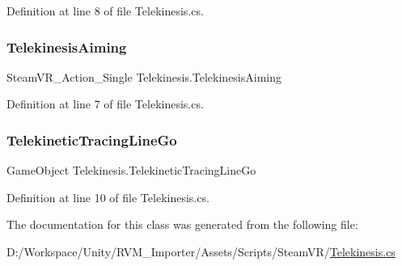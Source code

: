 Definition at line 8 of file Telekinesis.\+cs.

\mbox{\label{class_telekinesis_a7a53fb30be87da42a5c0f1c353961436}} 
\subsubsection{\texorpdfstring{TelekinesisAiming}{TelekinesisAiming}}
{\footnotesize\ttfamily Steam\+V\+R\+\_\+\+Action\+\_\+\+Single Telekinesis.\+Telekinesis\+Aiming}



Definition at line 7 of file Telekinesis.\+cs.

\mbox{\label{class_telekinesis_a4a511b637671edf2a8223b53f406fca6}} 
\subsubsection{\texorpdfstring{TelekineticTracingLineGo}{TelekineticTracingLineGo}}
{\footnotesize\ttfamily Game\+Object Telekinesis.\+Telekinetic\+Tracing\+Line\+Go}



Definition at line 10 of file Telekinesis.\+cs.



The documentation for this class was generated from the following file\+:\begin{DoxyCompactItemize}
\item 
D\+:/\+Workspace/\+Unity/\+R\+V\+M\+\_\+\+Importer/\+Assets/\+Scripts/\+Steam\+V\+R/\mbox{\hyperlink{_telekinesis_8cs}{Telekinesis.\+cs}}\end{DoxyCompactItemize}
